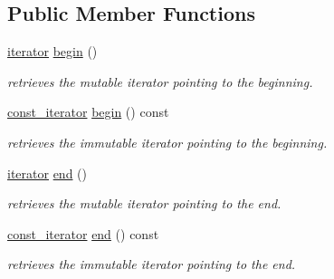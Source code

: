 \subsection*{Public Member Functions}
\begin{DoxyCompactItemize}
\item 
\hypertarget{classhryky_1_1_array_a12db8f567aa91dbbae25dca68db6e4d3}{\hyperlink{classhryky_1_1iterator_1_1random_1_1_mutable}{iterator} \hyperlink{classhryky_1_1_array_a12db8f567aa91dbbae25dca68db6e4d3}{begin} ()}\label{classhryky_1_1_array_a12db8f567aa91dbbae25dca68db6e4d3}

\begin{DoxyCompactList}\small\item\em retrieves the mutable iterator pointing to the beginning. \end{DoxyCompactList}\item 
\hypertarget{classhryky_1_1_array_a2e6fb08c9e286b0f33e17b98182a4cc7}{\hyperlink{classhryky_1_1iterator_1_1random_1_1_immutable}{const\-\_\-iterator} \hyperlink{classhryky_1_1_array_a2e6fb08c9e286b0f33e17b98182a4cc7}{begin} () const }\label{classhryky_1_1_array_a2e6fb08c9e286b0f33e17b98182a4cc7}

\begin{DoxyCompactList}\small\item\em retrieves the immutable iterator pointing to the beginning. \end{DoxyCompactList}\item 
\hypertarget{classhryky_1_1_array_a56e39a6620eeb368c9b237a82d7507bb}{\hyperlink{classhryky_1_1iterator_1_1random_1_1_mutable}{iterator} \hyperlink{classhryky_1_1_array_a56e39a6620eeb368c9b237a82d7507bb}{end} ()}\label{classhryky_1_1_array_a56e39a6620eeb368c9b237a82d7507bb}

\begin{DoxyCompactList}\small\item\em retrieves the mutable iterator pointing to the end. \end{DoxyCompactList}\item 
\hypertarget{classhryky_1_1_array_a1aa3afc76c5f450c572fef4a3cf0254d}{\hyperlink{classhryky_1_1iterator_1_1random_1_1_immutable}{const\-\_\-iterator} \hyperlink{classhryky_1_1_array_a1aa3afc76c5f450c572fef4a3cf0254d}{end} () const }\label{classhryky_1_1_array_a1aa3afc76c5f450c572fef4a3cf0254d}

\begin{DoxyCompactList}\small\item\em retrieves the immutable iterator pointing to the end. \end{DoxyCompactList}\end{DoxyCompactItemize}


